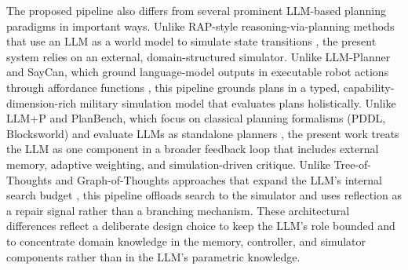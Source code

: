 The proposed pipeline also differs from several prominent LLM-based planning paradigms in important ways. Unlike RAP-style reasoning-via-planning methods that use an LLM as a world model to simulate state transitions \citep{hao2023rap}, the present system relies on an external, domain-structured simulator. Unlike LLM-Planner and SayCan, which ground language-model outputs in executable robot actions through affordance functions \citep{song2023llmplanner,ahn2022saycan}, this pipeline grounds plans in a typed, capability-dimension-rich military simulation model that evaluates plans holistically. Unlike LLM+P and PlanBench, which focus on classical planning formalisms (PDDL, Blocksworld) and evaluate LLMs as standalone planners \citep{liu2023llmp,valmeekam2023planbench}, the present work treats the LLM as one component in a broader feedback loop that includes external memory, adaptive weighting, and simulation-driven critique. Unlike Tree-of-Thoughts and Graph-of-Thoughts approaches that expand the LLM's internal search budget \citep{yao2023tree,besta2024graph}, this pipeline offloads search to the simulator and uses reflection as a repair signal rather than a branching mechanism. These architectural differences reflect a deliberate design choice to keep the LLM's role bounded and to concentrate domain knowledge in the memory, controller, and simulator components rather than in the LLM's parametric knowledge.

